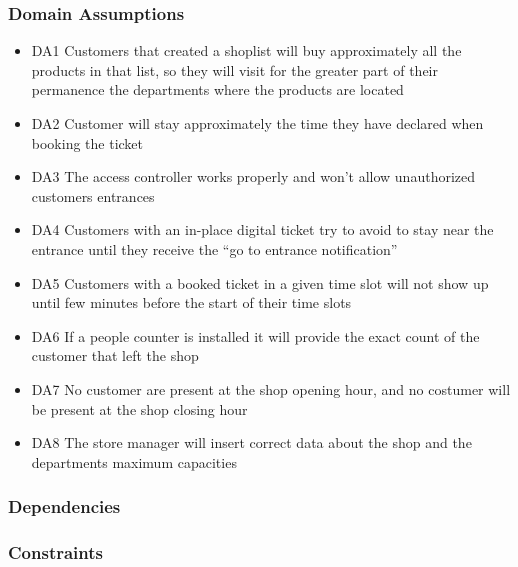 \subsubsection{Domain Assumptions}
\begin{itemize}[label={}]
    \item DA1 Customers that created a shoplist will buy approximately all the products in that list, so they will visit for the greater part of their permanence the departments where the products are located
    \item DA2 Customer will stay approximately the time they have declared when booking the ticket
    \item DA3 The access controller works properly and won't allow unauthorized customers entrances
    \item DA4 Customers with an in-place digital ticket try to avoid to stay near the entrance until they receive the ``go to entrance notification''
    \item DA5 Customers with a booked ticket in a given time slot will not show up until few minutes before the start of their time slots
    \item DA6 If a people counter is installed it will provide the exact count of the customer that left the shop
    \item DA7 No customer are present at the shop opening hour, and no costumer will be present at the shop closing hour
    \item DA8 The store manager will insert correct data about the shop and the departments maximum capacities
\end{itemize}
\subsubsection{Dependencies}
\subsubsection{Constraints}

